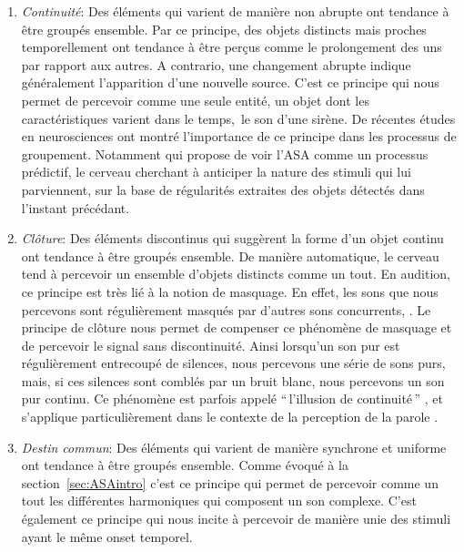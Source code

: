 \begin{enumerate}
\item \emph{Continuité}: Des éléments qui varient de manière non abrupte ont tendance à être groupés ensemble. Par ce principe, des objets distincts mais proches temporellement   ont tendance à être perçus comme le prolongement des uns par rapport aux autres. A contrario, une changement abrupte indique généralement l'apparition d'une nouvelle source. C'est ce principe qui nous permet de percevoir comme une seule entité, un objet dont les caractéristiques varient dans le temps,\eg~le son d'une sirène.
De récentes études en neurosciences ont montré l'importance de ce principe dans les processus de groupement. Notamment \citep{winkler2009modeling} qui propose de voir l'ASA comme un processus prédictif, le cerveau cherchant à anticiper la nature des stimuli qui lui parviennent, sur la base de régularités extraites des objets détectés dans l'instant précédant.

\item \emph{Clôture}: Des éléments discontinus qui suggèrent la forme d'un objet continu ont tendance à être groupés ensemble. De manière automatique, le cerveau tend à percevoir un ensemble d'objets distincts comme un tout. En audition, ce principe est très lié à la notion de masquage. En effet, les sons que nous percevons sont régulièrement masqués par d'autres sons concurrents,  . Le principe de clôture nous permet de compenser ce phénomène de masquage et de percevoir le signal sans discontinuité. Ainsi lorsqu'un son pur est régulièrement entrecoupé de silences, nous percevons une série de sons purs, mais, si ces silences sont comblés par un bruit blanc, nous percevons un son pur continu. Ce phénomène est parfois appelé ``\,l’illusion de continuité\,'' \citep{dannenbring1976perceived}, et s'applique particulièrement dans le contexte de la perception de la parole \citep{carlyon2002continuity}.

\item \emph{Destin commun}: Des éléments qui varient de manière synchrone et uniforme ont tendance à être groupés ensemble. Comme évoqué à la section~\ref{sec:ASAintro} c'est ce principe qui permet de percevoir comme un tout les différentes harmoniques qui composent un son complexe. C'est également ce principe qui nous incite à percevoir de manière unie des stimuli ayant le même onset temporel.
\end{enumerate}

